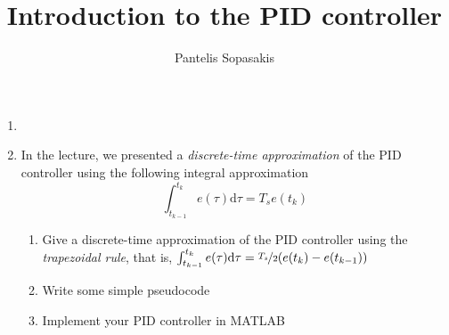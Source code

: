 \documentclass[a4paper,10pt,reqno]{amsart}
\title[PID Controller]{Introduction to the PID controller}
\author[P. Sopasakis]{Pantelis Sopasakis}
\numberwithin{equation}{section}
\theoremstyle{plain}
\begin{document}
\maketitle

\begin{enumerate}
 \item 

 \item In the lecture, we presented a \textit{discrete-time approximation} of the 
       PID controller using the following integral approximation
       \[
        \int_{t_{k-1}}^{t_k} e(\tau)\mathrm{d}\tau = T_s e(t_k)
       \]
      \begin{enumerate}
	\item Give a discrete-time approximation of the PID controller using the 
	      \textit{trapezoidal rule}, that is, 
	      \(\int_{t_{k-1}}^{t_k} e(\tau)\mathrm{d}\tau = \nicefrac{T_s}{2} (e(t_k) - e(t_{k-1}))\)
	\item Write some simple pseudocode
	\item Implement your PID controller in MATLAB
      \end{enumerate}
\end{enumerate}
\end{document}
